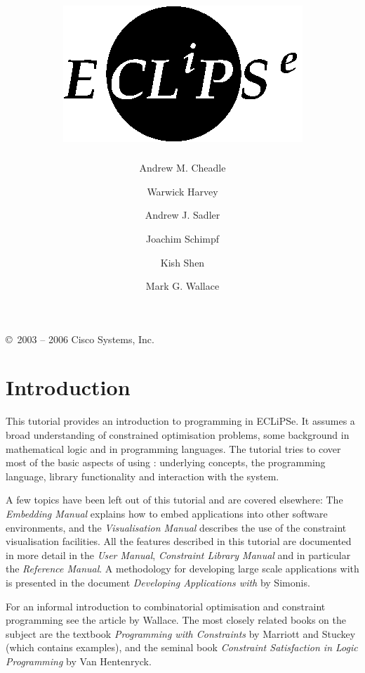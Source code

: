 \documentclass[11pt,a4paper]{book}
\title{\includegraphics{eclipselogo.eps}\\\vspace{5mm}{\huge A Tutorial Introduction}
}
\author{
Andrew M. Cheadle
\and Warwick Harvey
\and Andrew J. Sadler
\and Joachim Schimpf
\and Kish Shen
\and Mark G. Wallace
}
\begin{document}
\maketitle

\setcounter{page}{2}
\pagestyle{empty}

\vfill

\copyright\ 2003 -- 2006 Cisco Systems, Inc. 

\bigskip\bigskip\bigskip\bigskip\bigskip\bigskip

\cleardoublepage
\pagestyle{plain}

\tableofcontents

\cleardoublepage
{}



\chapter{Introduction}

This tutorial provides an introduction to programming in ECLiPSe.
It assumes a broad understanding of constrained optimisation
problems, some background in mathematical logic and in
programming languages.
The tutorial tries to cover most of the basic aspects of using {\eclipse}:
underlying concepts, the programming language, library functionality
and interaction with the system.

A few topics have been left out of this tutorial and are covered
elsewhere:  The {\em Embedding Manual} explains how to embed
\eclipse{} applications into other software environments, and the
{\em Visualisation Manual} describes the use of the constraint
visualisation facilities.
All the features described in this tutorial are documented in more
detail in the \eclipse{} {\em User Manual}, {\em Constraint Library
Manual} and in particular the {\em Reference Manual}.
A methodology for developing large scale applications with \eclipse{}
is presented in the document
{\em Developing Applications with \eclipse{}} by Simonis.

For an informal introduction to combinatorial optimisation
and constraint programming see the article
 by Wallace.
The most closely related books on the subject are the
textbook {\em Programming with Constraints} by
Marriott and Stuckey \cite{MarriottStuckey}
(which contains \eclipse{} examples),
and the seminal book
{\em Constraint Satisfaction in Logic Programming} \cite{VanHentenryck}
by Van Hentenryck.
\end{document}
